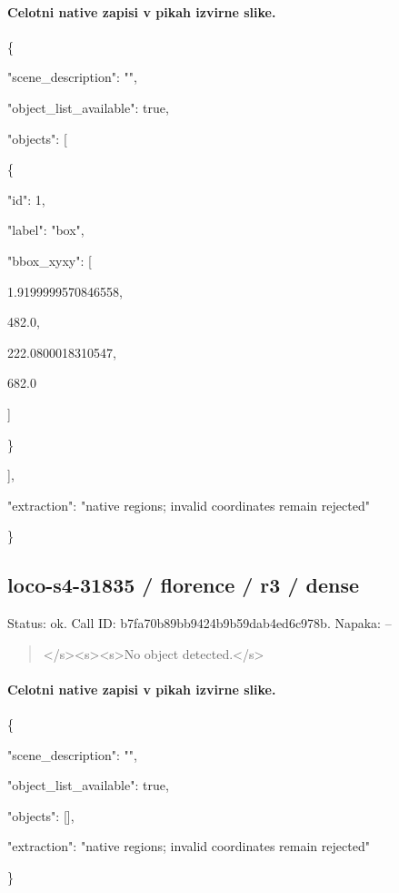 \documentclass[10pt,a4paper]{article}
\begin{document}
\paragraph{Celotni native zapisi v pikah izvirne slike.}
\{\par
  "scene\_description":\allowbreak{} "",\allowbreak{}\par
  "object\_list\_available":\allowbreak{} true,\allowbreak{}\par
  "objects":\allowbreak{} [\par
    \{\par
      "id":\allowbreak{} 1,\allowbreak{}\par
      "label":\allowbreak{} "box",\allowbreak{}\par
      "bbox\_xyxy":\allowbreak{} [\par
        1.9199999570846558,\allowbreak{}\par
        482.0,\allowbreak{}\par
        222.0800018310547,\allowbreak{}\par
        682.0\par
      ]\par
    \}\par
  ],\allowbreak{}\par
  "extraction":\allowbreak{} "native regions; invalid coordinates remain rejected"\par
\}
\subsection*{loco-s4-31835 / florence / r3 / dense}
Status: ok. Call ID: b7fa70b89bb9424b9b59dab4ed6c978b. Napaka: --
\begin{quote}\footnotesize
</s>\allowbreak{}<s>\allowbreak{}<s>\allowbreak{}No object detected.</s>\allowbreak{}
\end{quote}
\paragraph{Celotni native zapisi v pikah izvirne slike.}
\{\par
  "scene\_description":\allowbreak{} "",\allowbreak{}\par
  "object\_list\_available":\allowbreak{} true,\allowbreak{}\par
  "objects":\allowbreak{} [],\allowbreak{}\par
  "extraction":\allowbreak{} "native regions; invalid coordinates remain rejected"\par
\}
\end{document}
